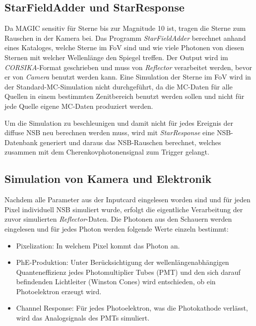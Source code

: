 \subsection{StarFieldAdder und StarResponse}
Da MAGIC sensitiv für Sterne bis zur Magnitude 10 ist, tragen die Sterne zum Rauschen in der Kamera bei.
Das Programm \textit{StarFieldAdder} berechnet anhand eines Kataloges, welche Sterne im FoV sind und wie viele Photonen von diesen Sternen mit welcher Wellenlänge den Spiegel treffen.
Der Output wird im \textit{CORSIKA}-Format geschrieben und muss von \textit{Reflector} verarbeitet werden, bevor er von \textit{Camera} benutzt werden kann.
Eine Simulation der Sterne im FoV wird in der Standard-MC-Simulation nicht durchgeführt, da die MC-Daten für alle Quellen in einem bestimmten Zenitbereich benutzt werden sollen und nicht für jede Quelle eigene MC-Daten produziert werden.

Um die Simulation zu beschleunigen und damit nicht für jedes Ereignis der diffuse NSB neu berechnen werden muss, wird mit \textit{StarResponse} eine NSB-Datenbank generiert und daraus das NSB-Rauschen berechnet, welches zusammen mit dem Cherenkovphotonensignal zum Trigger gelangt.

\subsection{Simulation von Kamera und Elektronik}
Nachdem alle Parameter aus der Inputcard eingelesen worden sind und für jeden Pixel individuell NSB simuliert wurde, erfolgt die eigentliche Verarbeitung der zuvor simulierten \textit{Reflector}-Daten.
Die Photonen aus den Schauern werden eingelesen und für jedes Photon werden folgende Werte einzeln bestimmt:

\begin{itemize}
 \item Pixelization: In welchem Pixel kommt das Photon an.
 \item PhE-Produktion: Unter Berücksichtigung der wellenlängenabhängigen Quanteneffizienz jedes Photomultiplier Tubes (PMT) und den sich darauf befindenden Lichtleiter (Winston Cones) wird entschieden, ob ein Photoelektron erzeugt wird.
 \item Channel Response: Für jedes Photoelektron, was die Photokathode verlässt, wird das Analogsignals des PMTs simuliert.
\end{itemize}

